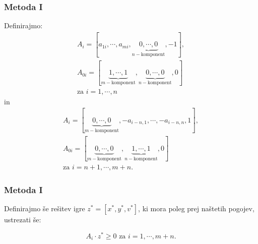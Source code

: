 \documentclass{beamer}
\theoremstyle{definition}
\theoremstyle{plain}
\begin{document}
\begin{frame}
    \frametitle{Metoda I}

    Definirajmo:
    \begin{equation*}
        \begin{split}
        A_i = [a_{1i}, \cdots, a_{mi}, \underbrace{0, \cdots, 0}_{n - \text{komponent}}, -1], \\
        A_{0i} = [\underbrace{1, \cdots, 1}_{m-\text{komponent}}, \underbrace{0, \cdots, 0}_{n-\text{komponent}}, 0] \\
        \text{za} \, \, i = 1, \cdots, n
        \end{split}
    \end{equation*} 
    in 
    \begin{equation*}
        \begin{split}
        A_i = [\underbrace{0, \cdots, 0}_{m - \text{komponent}},-a_{i-n, 1}, \cdots, -a_{i - n, n}, 1], \\
         A_{0i} = [\underbrace{0, \cdots, 0}_{m-\text{komponent}},\underbrace{1, \cdots, 1}_{n-\text{komponent}},  0] \\
        \text{za} \, \, i = n + 1, \cdots, m + n.
        \end{split}
    \end{equation*} 
    \end{frame}
    \begin{frame}
        \frametitle{Metoda I}
    
    Definirajmo še rešitev igre $z^* = [x^*, y^*, v^*]$, ki mora poleg prej naštetih pogojev, ustrezati še:

    \begin{equation}
        \label{eqn:e5}
    A_i \cdot z^* \geq 0 \, \, \text{za} \, \, i = 1, \cdots, m + n.
    \end{equation}
\end{frame}
\end{document}
